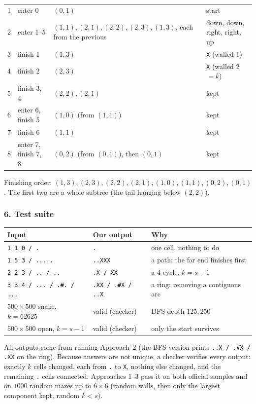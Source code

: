 \begin{tracebox}[{Sample 1, directions tried up, down, left, right; start $(0,1)$, $k = 2$}]
\begin{center}
\begin{tabular}{@{}clp{5.6cm}l@{}}
\midrule
1 & enter 0 & $(0,1)$ & start \\
2 & enter 1--5 & $(1,1), (2,1), (2,2), (2,3), (1,3)$, each from the previous & down, down, right, right, up \\
3 & finish 1 & $(1,3)$ & \texttt{X} (walled 1) \\
4 & finish 2 & $(2,3)$ & \texttt{X} (walled 2 $= k$) \\
5 & finish 3, 4 & $(2,2), (2,1)$ & kept \\
6 & enter 6, finish 5 & $(1,0)$ (from $(1,1)$) & kept \\
7 & finish 6 & $(1,1)$ & kept \\
8 & enter 7, finish 7, 8 & $(0,2)$ (from $(0,1)$), then $(0,1)$ & kept \\
\bottomrule
\end{tabular}
\end{center}
Finishing order: $(1,3), (2,3), (2,2), (2,1), (1,0), (1,1), (0,2), (0,1)$. The first two are a whole subtree (the tail hanging below $(2,2)$).
\end{tracebox}

\subsubsection*{6. Test suite}

\begin{testbox}
\centering\small
\begin{tabular}{@{}p{4.8cm}p{3.6cm}p{5.2cm}@{}}
\toprule
\textbf{Input} & \textbf{Our output} & \textbf{Why} \\
\midrule
\texttt{1 1 0 / .} & \texttt{.} & one cell, nothing to do \\
\texttt{1 5 3 / .....} & \texttt{..XXX} & a path: the far end finishes first \\
\texttt{2 2 3 / .. / ..} & \texttt{.X / XX} & a 4-cycle, $k = s - 1$ \\
\texttt{3 3 4 / ... / .\#. / ...} & \texttt{.XX / .\#X / ..X} & a ring: removing a contiguous arc \\
$500 \times 500$ snake, $k = 62625$ & valid (checker) & DFS depth $125{,}250$ \\
$500 \times 500$ open, $k = s - 1$ & valid (checker) & only the start survives \\
\bottomrule
\end{tabular}
\end{testbox}
All outputs come from running Approach~2 (the BFS version prints \texttt{..X / .\#X / .XX} on the ring). Because answers are not unique, a checker verifies every output: exactly $k$ cells changed, each from \texttt{.} to \texttt{X}, nothing else changed, and the remaining \texttt{.} cells connected. Approaches 1--3 pass it on both official samples and on $1000$ random mazes up to $6 \times 6$ (random walls, then only the largest component kept, random $k < s$).

